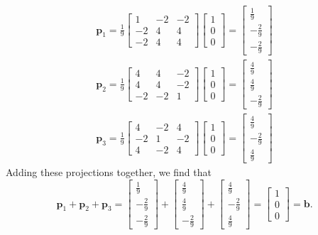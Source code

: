 \documentclass[11pt]{article}
\renewcommand{\vec}[1]{\mathbf{#1}}
\begin{document}
\begin{align*}
	\vec{p}_{1} = \frac{1}{9} \begin{bmatrix} 1 & -2 & -2 \\ -2 & 4 & 4 \\ -2 & 4 & 4 \end{bmatrix} \begin{bmatrix} 1 \\ 0 \\ 0 \end{bmatrix} = \boxed{\begin{bmatrix} \tfrac{1}{9} \\ -\tfrac{2}{9} \\ -\tfrac{2}{9} \end{bmatrix}} \\
	\vec{p}_{2} = \frac{1}{9} \begin{bmatrix} 4 & 4 & -2 \\ 4 & 4 & -2 \\ -2 & -2 & 1 \end{bmatrix} \begin{bmatrix} 1 \\ 0 \\ 0 \end{bmatrix} = \boxed{\begin{bmatrix} \tfrac{4}{9} \\ \tfrac{4}{9} \\ -\tfrac{2}{9} \end{bmatrix}} \\
	\vec{p}_{3} = \frac{1}{9} \begin{bmatrix} 4 & -2 & 4 \\ -2 & 1 & -2 \\ 4 & -2 & 4 \end{bmatrix} \begin{bmatrix} 1 \\ 0 \\ 0 \end{bmatrix} = \boxed{\begin{bmatrix} \tfrac{4}{9} \\ -\tfrac{2}{9} \\ \tfrac{4}{9} \end{bmatrix}}
\end{align*}
Adding these projections together, we find that
\[
	\vec{p}_{1} + \vec{p}_{2} + \vec{p}_{3} = \begin{bmatrix} \tfrac{1}{9} \\ -\tfrac{2}{9} \\ -\tfrac{2}{9} \end{bmatrix} + \begin{bmatrix} \tfrac{4}{9} \\ \tfrac{4}{9} \\ -\tfrac{2}{9} \end{bmatrix} + \begin{bmatrix} \tfrac{4}{9} \\ -\tfrac{2}{9} \\ \tfrac{4}{9} \end{bmatrix} = \begin{bmatrix} 1 \\ 0 \\ 0 \end{bmatrix} = \boxed{\vec{b}}.
\]
\end{document}
